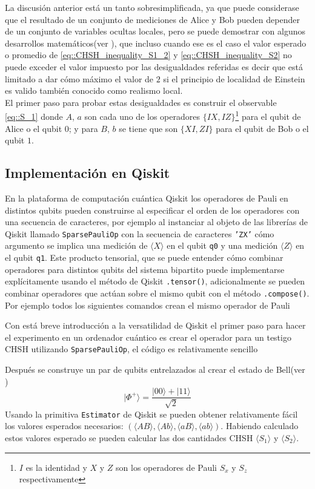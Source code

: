 \documentclass[a4paper]{article}
\begin{document}
La discusión anterior está un tanto sobresimplificada, ya que puede considerase que el resultado de un conjunto de mediciones de Alice y Bob pueden depender de un conjunto de variables ocultas locales, pero se puede demostrar con algunos desarrollos matemáticos(ver \cite{Clauser}), que incluso cuando ese es el caso el valor esperado o promedio de \ref{eq::CHSH_inequality_S1_2} y \ref{eq::CHSH_inequality_S2} no puede exceder el valor impuesto por las desigualdades referidas es decir que está limitado a dar cómo máximo el valor de $2$ si el principio de localidad de Einstein es valido también conocido como realismo local.\\

El primer paso para probar estas desigualdades es construir el observable \ref{eq::S_1} donde $A$, $a$ son cada uno de los operadores $\{IX, IZ\}$\footnote{$I$ es la identidad y $X$ y $Z$ son los operadores de Pauli $S_x$ y $S_z$ respectivamente} para el qubit de Alice o el qubit $0$; y para $B$, $b$ se tiene que son $\{XI, ZI\}$ para el qubit de Bob o el qubit $1$.
\subsection{Implementación en Qiskit}
En la plataforma de computación cuántica Qiskit los operadores de Pauli en distintos qubits pueden construirse al especificar el orden de los operadores con una secuencia de caracteres, por ejemplo al instanciar al objeto de las librerías de Qiskit llamado \texttt{SparsePauliOp} con la secuencia de caracteres \texttt{'ZX'} cómo argumento se implica una medición de $\langle X \rangle$ en el qubit \texttt{q0} y una medición $\langle Z \rangle$ en el qubit \texttt{q1}. Este producto tensorial, que se puede entender cómo combinar operadores para distintos qubits del sistema bipartito puede implementarse explícitamente usando el método de Qiskit \texttt{.tensor()}, adicionalmente se pueden combinar operadores que actúan sobre el mismo qubit con el método \texttt{.compose()}. Por ejemplo todos los siguientes comandos crean el mismo operador de Pauli



Con está breve introducción a la versatilidad de Qiskit el primer paso para hacer el experimento en un ordenador cuántico es crear el operador para un testigo CHSH utilizando \texttt{SparsePauliOp}, el código es relativamente sencillo


Después se construye un par de qubits entrelazados al crear el estado de Bell(ver \cite{Medina})
\begin{equation}\label{eq::Bell_state}
|\Phi^{+}\rangle=\frac{|00\rangle+|11\rangle}{\sqrt{2}}
\end{equation}
Usando la primitiva \texttt{Estimator} de Qiskit se pueden obtener relativamente fácil los valores esperados necesarios: $(\langle AB \rangle, \langle Ab\rangle, \langle aB \rangle, \langle ab\rangle)$. Habiendo calculado estos valores esperado se pueden calcular las dos cantidades CHSH $\langle S_1\rangle$ y $\langle S_2\rangle$.\\
\end{document}
